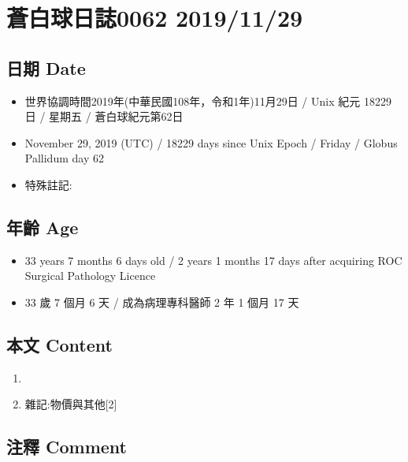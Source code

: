 \documentclass[
]{article}
\providecommand{\tightlist}{%
  \setlength{\itemsep}{0pt}\setlength{\parskip}{0pt}}
\begin{document}
\hypertarget{ux84bcux767dux7403ux65e5ux8a8c0062-20191129}{%
\section{蒼白球日誌0062
2019/11/29}\label{ux84bcux767dux7403ux65e5ux8a8c0062-20191129}}

\hypertarget{ux65e5ux671f-date-28}{%
\subsection{日期 Date}\label{ux65e5ux671f-date-28}}

\begin{itemize}
\tightlist
\item
  世界協調時間2019年(中華民國108年，令和1年)11月29日 / Unix 紀元 18229
  日 / 星期五 / 蒼白球紀元第62日
\item
  November 29, 2019 (UTC) / 18229 days since Unix Epoch / Friday /
  Globus Pallidum day 62
\item
  特殊註記:
\end{itemize}

\hypertarget{ux5e74ux9f61-age-28}{%
\subsection{年齡 Age}\label{ux5e74ux9f61-age-28}}

\begin{itemize}
\tightlist
\item
  33 years 7 months 6 days old / 2 years 1 months 17 days after
  acquiring ROC Surgical Pathology Licence
\item
  33 歲 7 個月 6 天 / 成為病理專科醫師 2 年 1 個月 17 天
\end{itemize}

\hypertarget{ux672cux6587-content-28}{%
\subsection{本文 Content}\label{ux672cux6587-content-28}}

\begin{enumerate}
\def\labelenumi{\arabic{enumi}.}
\item
\item
  雜記:物價與其他{[}2{]}
\end{enumerate}

\hypertarget{ux6ce8ux91cb-comment-28}{%
\subsection{注釋 Comment}\label{ux6ce8ux91cb-comment-28}}
\end{document}

